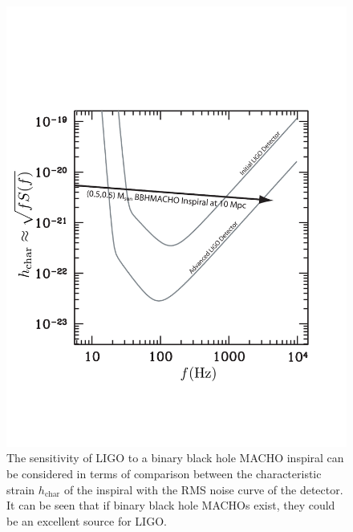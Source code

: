 \begin{figure}[p]
\label{f:machosensitivity}
\begin{center}
\includegraphics[width=\linewidth]{figures/macho/noisecurves}
\end{center}
\caption[Sensitivity of LIGO to a Binary Black Hole MACHO Inspiral]{%
The sensitivity of LIGO to a binary black hole MACHO inspiral can be
considered in terms of comparison between the characteristic strain
$h_\mathrm{char}$ of the inspiral with the RMS noise curve of the detector. It
can be seen that if binary black hole MACHOs exist, they could be an excellent
source for LIGO.
}
\end{figure}

